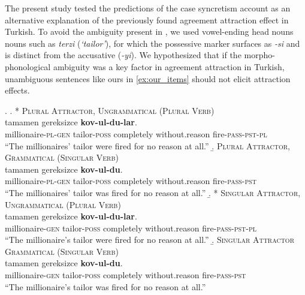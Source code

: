 \documentclass[]{interact}\usepackage[]{graphicx}\usepackage[]{color}
\theoremstyle{plain}%
\theoremstyle{definition}
\theoremstyle{remark}
\begin{document}
The present study tested the predictions of the case syncretism account as an alternative explanation of the previously found agreement attraction effect in Turkish. To avoid the ambiguity present in \citet{LagoEtAl:2019}, we used vowel-ending head nouns nouns such as \textit{terzi} (\textit{`tailor'}), for which the possessive marker surfaces as \textit{-si} and is distinct from the accusative (\textit{-yi}). We hypothesized that if the morpho-phonological ambiguity was a key factor in agreement attraction in Turkish, unambiguous sentences like ours in \ref{ex:our_items} should not elicit attraction effects.

\ex. \label{ex:our_items}
  \a. * \textsc{Plural Attractor, Ungrammatical (Plural Verb)} \label{ex:expitem-plpl}\\
   tamamen gereksizce \textbf{kov-ul-du-lar}.\\
  millionaire-\textsc{pl}-\textsc{gen} tailor-\textsc{poss} completely without.reason fire-\textsc{pass}-\textsc{pst}-\textsc{pl}\\
  \glt ``The millionaires' tailor were fired for no reason at all.''
  \b. \textsc{Plural Attractor, Grammatical (Singular Verb)} \label{ex:expitem-plsg} \\
   tamamen gereksizce \textbf{kov-ul-du}.\\
  millionaire-\textsc{pl}-\textsc{gen} tailor-\textsc{poss} completely without.reason fire-\textsc{pass}-\textsc{pst}\\
  \glt ``The millionaires' tailor was fired for no reason at all.''
  \b. * \textsc{Singular Attractor, Ungrammatical (Plural Verb)} \label{ex:expitem-sgpl}\\
   tamamen gereksizce \textbf{kov-ul-du-lar}.\\
  millionaire-\textsc{gen} tailor-\textsc{poss} completely without.reason fire-\textsc{pass}-\textsc{pst}-\textsc{pl}\\
  \glt ``The millionaire's tailor were fired for no reason at all.''
  \b. \textsc{Singular Attractor Grammatical (Singular Verb)} \label{ex:expitem-sgsg}\\
   tamamen gereksizce \textbf{kov-ul-du}.\\
  millionaire-\textsc{gen} tailor-\textsc{poss} completely without.reason fire-\textsc{pass}-\textsc{pst}\\
  \glt ``The millionaire's tailor was fired for no reason at all.''
  
\end{document}
